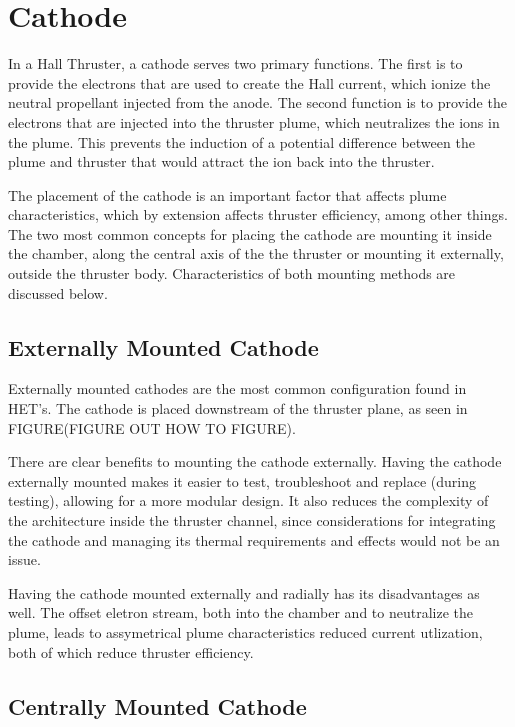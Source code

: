 \section{Cathode}

In a Hall Thruster, a cathode serves two primary functions. The first is to provide the electrons that are used to create the Hall current, which ionize the neutral propellant injected from the anode. The second function is to provide the electrons that are injected into the thruster plume, which neutralizes the ions in the plume. This prevents the induction of a potential difference between the plume and thruster that would attract the ion back into the thruster. 

The placement of the cathode is an important factor that affects plume characteristics, which by extension affects thruster efficiency, among other things. The two most common concepts for placing the cathode are mounting it inside the chamber, along the central axis of the the thruster or mounting it externally, outside the thruster body. Characteristics of both mounting methods are discussed below.

\subsection{Externally Mounted Cathode}

Externally mounted cathodes are the most common configuration found in \ac{HET}'s. The cathode is placed downstream of the thruster plane, as seen in FIGURE(FIGURE OUT HOW TO FIGURE). 

There are clear benefits to mounting the cathode externally. Having the cathode externally mounted makes it easier to test, troubleshoot and replace (during testing), allowing for a more modular design. It also reduces the complexity of the architecture inside the thruster channel, since considerations for integrating the cathode and managing its thermal requirements and effects would not be an issue.

Having the cathode mounted externally and radially has its disadvantages as well. The offset eletron stream, both into the chamber and to neutralize the plume, leads to assymetrical plume characteristics reduced current utlization, both of which reduce thruster efficiency.

\subsection{Centrally Mounted Cathode}

